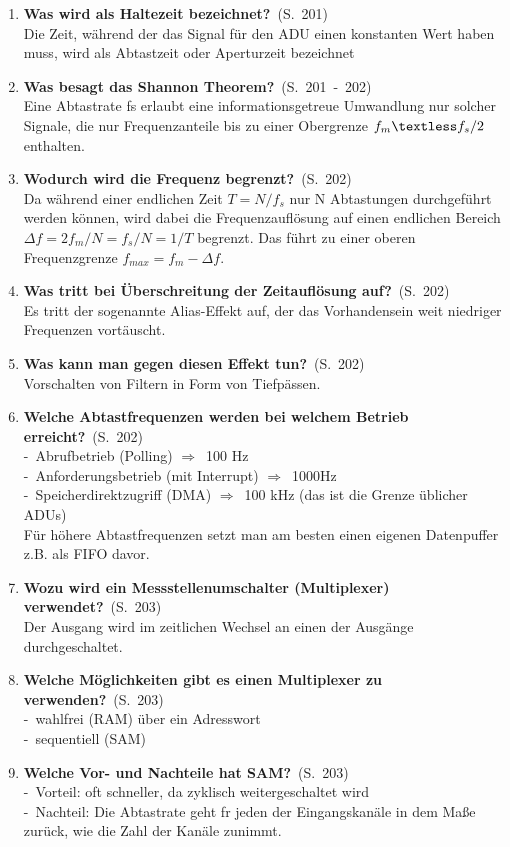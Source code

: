 \documentclass[a4paper,12pt]{article}
\newcommand{\question}[3]{\pagebreak[3]\item {\textbf{#1?}}\ (S.\ #2)#3}
\newcommand{\catchword}[1]{\\-\ #1}
\newcommand{\normaltext}[1]{\\#1}
\newcommand{\resultol}[1]{$\Rightarrow$\ #1}
\newcommand{\page}[1]{#1}
\newcommand{\pages}[2]{#1\ -\ #2}
\begin{document}
\begin{enumerate}
  \question{Was wird als Haltezeit bezeichnet}{\page{201}}
  {
    \normaltext{Die Zeit, während der das Signal für den ADU einen konstanten Wert haben muss,
                wird als Abtastzeit oder Aperturzeit bezeichnet}
  }

\question{Was besagt das Shannon Theorem}{\pages{201}{202}}
  {
    \normaltext{Eine Abtastrate fs erlaubt eine informationsgetreue Umwandlung nur solcher Signale, die
                nur Frequenzanteile bis zu einer Obergrenze $  f_m\textless f_s/2 $ enthalten.}
  }

  \question{Wodurch wird die Frequenz begrenzt}{\page{202}}
  {
    \normaltext{Da während einer endlichen Zeit $ T = N/f_s $  nur N Abtastungen durchgeführt
                werden können, wird dabei die Frequenzauflösung auf einen endlichen Bereich
                $ \Delta f = 2f_m/N = f_s/N = 1/T $ begrenzt. Das führt zu einer oberen
                Frequenzgrenze $ f_{max} = f_m - \Delta f $.  }
  }

  \question{Was tritt bei Überschreitung der Zeitauflösung auf}{\page{202}}
  {
    \normaltext{Es tritt der sogenannte Alias-Effekt auf, der das Vorhandensein weit niedriger
                Frequenzen vortäuscht.}
  }

  \question{Was kann man gegen diesen Effekt tun}{\page{202}}
  {
    \normaltext{Vorschalten von Filtern in Form von Tiefpässen.}
  }

  \question{Welche Abtastfrequenzen werden bei welchem Betrieb erreicht}{\page{202}}
  {
    \catchword{Abrufbetrieb (Polling) \resultol{100 Hz}}
    \catchword{Anforderungsbetrieb (mit Interrupt) \resultol{1000Hz}}
    \catchword{Speicherdirektzugriff (DMA) \resultol 100 kHz (das ist die Grenze üblicher ADUs)}
    \normaltext{Für höhere Abtastfrequenzen setzt man am besten einen eigenen Datenpuffer z.B. als
                FIFO davor.}
  }

  \question{Wozu wird ein Messstellenumschalter (Multiplexer) verwendet}{\page{203}}
  {
    \normaltext{Der Ausgang wird im zeitlichen Wechsel an einen der Ausgänge durchgeschaltet.}
  }

  \question{Welche Möglichkeiten gibt es einen Multiplexer zu verwenden}{\page{203}}
  {
    \catchword{wahlfrei (RAM) über ein Adresswort}
    \catchword{sequentiell (SAM)}
  }

  \question{Welche Vor- und Nachteile hat SAM}{\page{203}}
  {
    \catchword{Vorteil: oft schneller, da zyklisch weitergeschaltet wird}
    \catchword{Nachteil: Die Abtastrate geht fr jeden der Eingangskanäle in dem Maße zurück, wie die Zahl der 
               Kanäle zunimmt.}
  }


\end{enumerate}
\end{document}
